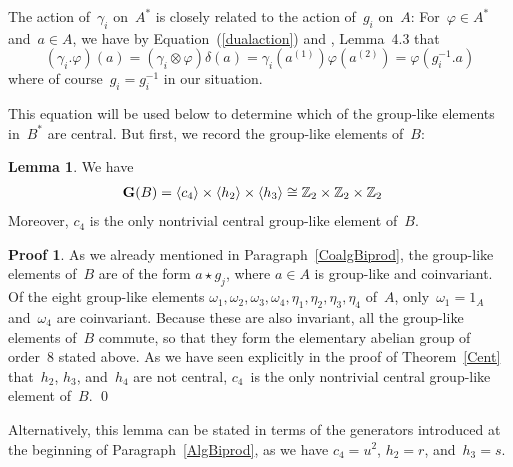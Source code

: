 \documentclass{article}
\numberwithin{equation}{section}
\theoremstyle{definition}
\newtheorem*{lem}{Lemma}
\newtheorem*{pf}{Proof}
\theoremstyle{break}
\newcommand{\ot}{\mathbin{\otimes}}
\newcommand{\1}{{(1)}}
\newcommand{\2}{{(2)}}
\newcommand{\3}{{(3)}}
\newcommand{\A}{1_A}
\newcommand{\Z}{{\mathbb Z}}
\begin{document}
The action of~$\gamma_i$ on~$A^*$ is closely related to the action of~$g_i$ on~$A$:
For~$\varphi \in A^*$ and~$a \in A$, we have by Equation~(\ref{dualaction}) and \cite{KaSo2}, Lemma~4.3 that
\begin{equation} \label{dualaction2}
\left( \gamma_i .\varphi \right) (a) =  \left( \gamma_i \ot \varphi \right)\delta(a)
= \gamma_i(a^\1) \varphi (a^\2) = \varphi(g_i^{-1}.a)
\end{equation}
where of course~$g_i = g_i^{-1}$ in our situation.

This equation will be used below to determine which of the group-like elements in~$B^*$ are central. But first, we record the group-like elements of~$B$:
\begin{lem} \label{GrouplB}
We have
\begin{align*}
{\bf G}(B) &=  \left\langle c_4 \right\rangle \times \left\langle h_2 \right\rangle \times \left\langle h_3 \right\rangle \cong \Z_2 \times \Z_2 \times \Z_2
\end{align*}
Moreover, $c_4$ is the only nontrivial central group-like element of~$B$.
\end{lem}
\begin{pf}
As we already mentioned in Paragraph~\ref{CoalgBiprod}, the group-like elements of~$B$ are of the form $a \star g_j$, where $a \in A$ is group-like and coinvariant. Of the eight group-like elements
$\omega_1, \omega_2, \omega_3, \omega_4, \eta_1, \eta_2, \eta_3, \eta_4$ of~$A$, only~$\omega_1 = \A$ and~$\omega_4$ are coinvariant. Because these are also invariant, all the group-like elements of~$B$ commute, so that they form the elementary abelian group of order~$8$ stated above. As we have seen explicitly in the proof of Theorem~\ref{Cent} that~$h_2$, $h_3$, and~$h_4$ are not central, $c_4$~is the only nontrivial central group-like element of~$B$.
\qed
\end{pf}

Alternatively, this lemma can be stated in terms of the generators introduced at the beginning of Paragraph~\ref{AlgBiprod}, as we have $c_4 = u^2$, $h_2 = r$, and~$h_3 = s$.
\end{document}
